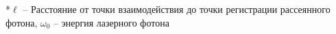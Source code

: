 \documentclass[12pt,aspectratio=169]{beamer}
\begin{document}
\begin{frame}[t]
\begin{columns}[T]
\begin{column}{0.49\linewidth}
\begin{minipage}{1.\linewidth}
		\end{minipage} 
	\end{column}
\end{columns}
	\vfill
\footnotesize{*$\ell$ -- Расстояние от точки взаимодействия до точки регистрации рассеянного фотона, $\omega_0$ -- энергия лазерного фотона}
\end{frame}
\end{document}
